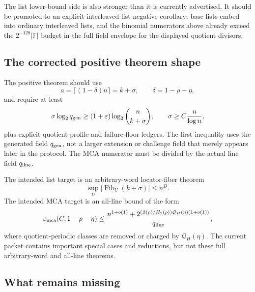 \documentclass[11pt]{article}
\newcommand{\F}{\mathbb F}
\newcommand{\qline}{q_{\rm line}}
\newcommand{\qgen}{q_{\rm gen}}
\newcommand{\epsmca}{\varepsilon_{\rm mca}}
\newcommand{\Fib}{\operatorname{Fib}}
\newcommand{\Htwo}{H_2}
\newcommand{\QH}{\mathcal Q_H}
\begin{document}
The list lower-bound side is also stronger than it is currently advertised.  It
should be promoted to an explicit interleaved-list negative corollary: base lists
embed into ordinary interleaved lists, and the binomial numerators above already
exceed the \(2^{-128}|\F|\) budget in the full field envelope for the displayed
quotient divisors.

\subsection{The corrected positive theorem shape}

The positive theorem should use
\[
  a=\lceil(1-\delta)n\rceil=k+\sigma,
  \qquad \delta=1-\rho-\eta,
\]
and require at least
\[
  \sigma\log_2\qgen
  \ge (1+\varepsilon)\log_2\binom n{k+\sigma},
  \qquad
  \sigma\ge C\frac n{\log n},
\]
plus explicit quotient-profile and failure-floor ledgers.  The first inequality
uses the generated field \(\qgen\), not a larger extension or challenge field
that merely appears later in the protocol.  The MCA numerator must be divided by
the actual line field \(\qline\).

The intended list target is an arbitrary-word locator-fiber theorem
\[
  \sup_U |\Fib_U(k+\sigma)|\le n^B.
\]
The intended MCA target is an all-line bound of the form
\[
  \epsmca(C,1-\rho-\eta)
  \le
  \frac{
    n^{1+o(1)}
    +2^{(\beta(\rho)/\Htwo(\rho))\QH(\eta)(1+o(1))}
  }{\qline},
\]
where quotient-periodic classes are removed or charged by \(\QH(\eta)\).  The
current packet contains important special cases and reductions, but not these
full arbitrary-word and all-line theorems.

\subsection{What remains missing}
\end{document}
